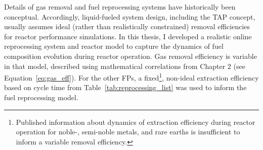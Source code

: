 Details of gas removal and fuel reprocessing systems have historically 
been conceptual. Accordingly, liquid-fueled system design, including the 
\gls{TAP} concept, usually assumes ideal (rather than realistically 
constrained) removal efficiencies for reactor performance simulations. In this 
thesis, I developed a realistic online reprocessing system and reactor model 
to capture the dynamics of fuel composition evolution during reactor 
operation. Gas removal efficiency is variable in that model, described using 
mathematical correlations from Chapter 2 (see Equation~\ref{eq:gas_eff}). For 
the other \glspl{FP}, a fixed\footnote{Published information about dynamics of 
extraction efficiency during reactor operation for noble-, semi-noble metals, 
and rare earths is insufficient to inform a variable removal efficiency.}, 
non-ideal extraction efficiency based on cycle time from  
Table~\ref{tab:reprocessing_list} was used to inform the fuel reprocessing 
model.


